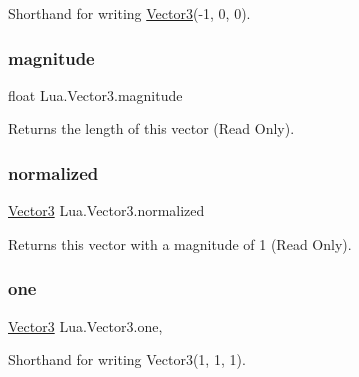 Shorthand for writing \mbox{\hyperlink{class_lua_1_1_vector3}{Vector3}}(-\/1, 0, 0). 

\mbox{\label{class_lua_1_1_vector3_af7a889228914dff8226722de5c47a9b7}} 
\subsubsection{\texorpdfstring{magnitude}{magnitude}}
{\footnotesize\ttfamily float Lua.\+Vector3.\+magnitude\hspace{0.3cm}{\ttfamily [get]}}



Returns the length of this vector (Read Only). 

\mbox{\label{class_lua_1_1_vector3_a4e2f1c26b10b35c7a23108cfaa63320c}} 
\subsubsection{\texorpdfstring{normalized}{normalized}}
{\footnotesize\ttfamily \mbox{\hyperlink{class_lua_1_1_vector3}{Vector3}} Lua.\+Vector3.\+normalized\hspace{0.3cm}{\ttfamily [get]}}



Returns this vector with a magnitude of 1 (Read Only). 

\mbox{\label{class_lua_1_1_vector3_a16592c4087c4d02cf1dd00a06d5baced}} 
\subsubsection{\texorpdfstring{one}{one}}
{\footnotesize\ttfamily \mbox{\hyperlink{class_lua_1_1_vector3}{Vector3}} Lua.\+Vector3.\+one\hspace{0.3cm}{\ttfamily [static]}, {\ttfamily [get]}}



Shorthand for writing Vector3(1, 1, 1). 

\mbox{\label{class_lua_1_1_vector3_ae8a79f66fb993fb1ad05c81fd3bbb9e3}} 
